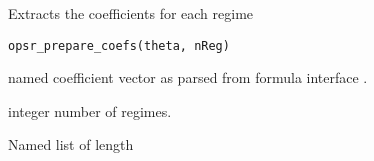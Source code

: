 %
\begin{Description}
Extracts the coefficients for each regime
\end{Description}
%
\begin{Usage}
\begin{verbatim}
opsr_prepare_coefs(theta, nReg)
\end{verbatim}
\end{Usage}
%
\begin{Arguments}
\begin{ldescription}
\item[\code{theta}] named coefficient vector as parsed from formula interface .

\item[\code{nReg}] integer number of regimes.
\end{ldescription}
\end{Arguments}
%
\begin{Value}
Named list of length 
\end{Value}
%
\begin{Examples}
\end{Examples}


